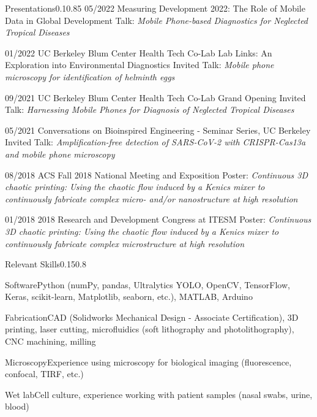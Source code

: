 \documentclass{federico_cv}
\begin{document}
\begin{tblSection}{Presentations}{0.1}{0.85}
\leftbfrightsingle
{05/2022}
{Measuring Development 2022: The Role of Mobile Data in Global Development} %
{Talk: \textit{Mobile Phone-based Diagnostics for Neglected Tropical Diseases}}

\leftbfrightsingle
{01/2022}
{UC Berkeley Blum Center Health Tech Co-Lab Lab Links: An Exploration into Environmental Diagnostics}
{Invited Talk: \textit{Mobile phone microscopy for identification of helminth eggs}}

\leftbfrightsingle
{09/2021}
{UC Berkeley Blum Center Health Tech Co-Lab Grand Opening}
{Invited Talk: \textit{Harnessing Mobile Phones for Diagnosis of Neglected Tropical Diseases}}

\leftbfrightsingle
{05/2021}
{Conversations on Bioinspired Engineering - Seminar Series, UC Berkeley}
{Invited Talk: \textit{Amplification-free detection of SARS-CoV-2 with CRISPR-Cas13a and mobile phone microscopy}}

\leftbfrightsinglenobreak
{08/2018}
{ACS Fall 2018 National Meeting and Exposition}
{Poster: \textit{Continuous 3D chaotic printing: Using the chaotic flow induced by a Kenics mixer to continuously fabricate complex micro- and/or nanostructure at high resolution}}

\leftbfrightsingle
{01/2018}
{2018 Research and Development Congress at ITESM}
{Poster: \textit{Continuous 3D chaotic printing: Using the chaotic flow induced by a Kenics mixer to continuously fabricate complex microstructure at high resolution}}

\end{tblSection}



\begin{tblSection}{Relevant Skills}{0.15}{0.8}

    \skill
    {Software}{Python (numPy, pandas, Ultralytics YOLO, OpenCV, TensorFlow, Keras, scikit-learn, Matplotlib, seaborn, etc.), MATLAB, Arduino}

    \skill
    {Fabrication}{CAD (Solidworks Mechanical Design - Associate Certification), 3D printing, laser cutting, microfluidics (soft lithography and photolithography), CNC machining, milling}
    
    \skill
    {Microscopy}{Experience using microscopy for biological imaging (fluorescence, confocal, TIRF, etc.)}

    \skill
    {Wet lab}{Cell culture, experience working with patient samples (nasal swabs, urine, blood)}


\end{tblSection}
\end{document}
